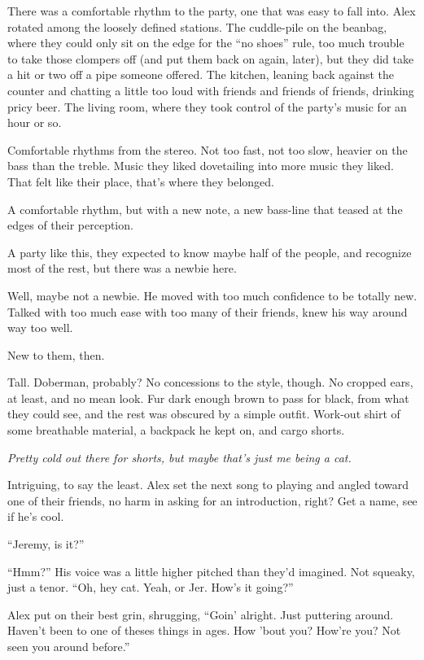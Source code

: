 There was a comfortable rhythm to the party, one that was easy to fall into. Alex rotated among the loosely defined stations. The cuddle-pile on the beanbag, where they could only sit on the edge for the ``no shoes'' rule, too much trouble to take those clompers off (and put them back on again, later), but they did take a hit or two off a pipe someone offered. The kitchen, leaning back against the counter and chatting a little too loud with friends and friends of friends, drinking pricy beer. The living room, where they took control of the party's music for an hour or so.

Comfortable rhythms from the stereo. Not too fast, not too slow, heavier on the bass than the treble. Music they liked dovetailing into more music they liked. That felt like their place, that's where they belonged.

A comfortable rhythm, but with a new note, a new bass-line that teased at the edges of their perception.

A party like this, they expected to know maybe half of the people, and recognize most of the rest, but there was a newbie here.

Well, maybe not a newbie. He moved with too much confidence to be totally new. Talked with too much ease with too many of their friends, knew his way around way too well.

New to them, then.

Tall. Doberman, probably? No concessions to the style, though. No cropped ears, at least, and no mean look. Fur dark enough brown to pass for black, from what they could see, and the rest was obscured by a simple outfit. Work-out shirt of some breathable material, a backpack he kept on, and cargo shorts.

\emph{Pretty cold out there for shorts, but maybe that's just me being a cat.}

Intriguing, to say the least. Alex set the next song to playing and angled toward one of their friends, no harm in asking for an introduction, right? Get a name, see if he's cool.

``Jeremy, is it?''

``Hmm?'' His voice was a little higher pitched than they'd imagined. Not squeaky, just a tenor. ``Oh, hey cat. Yeah, or Jer. How's it going?''

Alex put on their best grin, shrugging, ``Goin' alright. Just puttering around. Haven't been to one of theses things in ages. How 'bout you? How're you? Not seen you around before.''

